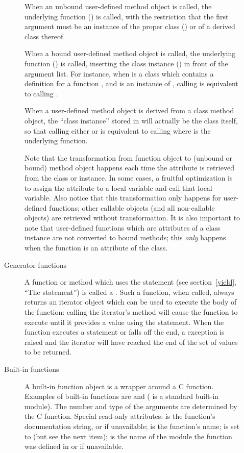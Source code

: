 \begin{description}
\begin{description}
When an unbound user-defined method object is called, the underlying
function () is called, with the restriction that the
first argument must be an instance of the proper class
() or of a derived class thereof.

When a bound user-defined method object is called, the underlying
function () is called, inserting the class instance
() in front of the argument list.  For instance, when
 is a class which contains a definition for a function
, and  is an instance of , calling
 is equivalent to calling .

When a user-defined method object is derived from a class method object,
the ``class instance'' stored in  will actually be the
class itself, so that calling either  or  is
equivalent to calling  where  is the underlying
function.

Note that the transformation from function object to (unbound or
bound) method object happens each time the attribute is retrieved from
the class or instance.  In some cases, a fruitful optimization is to
assign the attribute to a local variable and call that local variable.
Also notice that this transformation only happens for user-defined
functions; other callable objects (and all non-callable objects) are
retrieved without transformation.  It is also important to note that
user-defined functions which are attributes of a class instance are
not converted to bound methods; this \emph{only} happens when the
function is an attribute of the class.

\item[Generator functions\index{generator!function}\index{generator!iterator}]
A function or method which uses the  statement (see
section~\ref{yield}, ``The  statement'') is called a
.  Such a function, when called, always
returns an iterator object which can be used to execute the body of
the function:  calling the iterator's  method will
cause the function to execute until it provides a value using the
 statement.  When the function executes a
 statement or falls off the end, a
 exception is raised and the iterator will
have reached the end of the set of values to be returned.

\item[Built-in functions]
A built-in function object is a wrapper around a C function.  Examples
of built-in functions are  and 
( is a standard built-in module).
The number and type of the arguments are
determined by the C function.
Special read-only attributes:  is the function's
documentation string, or  if unavailable; 
is the function's name;  is set to  (but see
the next item);  is the name of the module the
function was defined in or  if unavailable.


\end{description}
\end{description}
